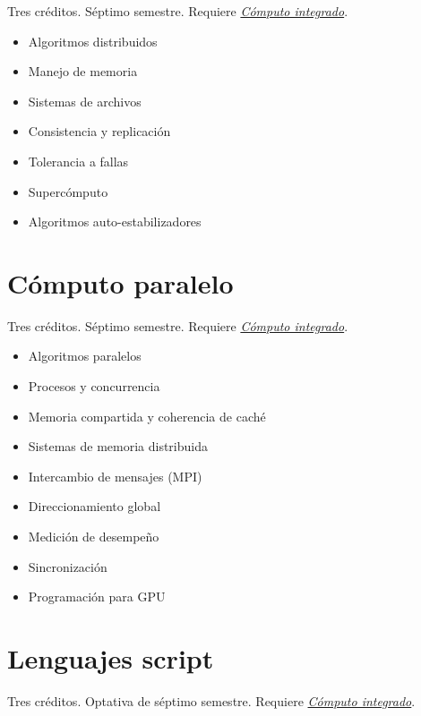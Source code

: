 \documentclass{article}
\begin{document}
\begin{multicols}{4}
Tres cr\'{e}ditos. S\'{e}ptimo semestre. Requiere \hyperlink{ci}{\em
  C\'{o}mputo integrado}.

\begin{itemize}
\item{Algoritmos distribuidos}
\item{Manejo de memoria}
\item{Sistemas de archivos}
\item{Consistencia y replicaci\'{o}n}
\item{Tolerancia a fallas}
\item{Superc\'{o}mputo}
\item{Algoritmos auto-estabilizadores}
\end{itemize}

\vfill\null \columnbreak

\hypertarget{cp}{\section*{C\'{o}mputo paralelo}} 

Tres cr\'{e}ditos. S\'{e}ptimo semestre. Requiere \hyperlink{ci}{\em
  C\'{o}mputo integrado}.

\begin{itemize}
\item{Algoritmos paralelos}
\item{Procesos y concurrencia}
\item{Memoria compartida y coherencia de cach\'{e}}
\item{Sistemas de memoria distribuida}
\item{Intercambio de mensajes (MPI)}
\item{Direccionamiento global}
\item{Medici\'{o}n de desempe\~{n}o}
\item{Sincronizaci\'{o}n}
\item{Programaci\'{o}n para GPU}
\end{itemize}

\vfill\null \columnbreak

\hypertarget{ls}{\section*{Lenguajes script}}

Tres cr\'{e}ditos. Optativa de s\'{e}ptimo semestre.
 Requiere \hyperlink{ci}{\em
  C\'{o}mputo integrado}.


\end{multicols}
\end{document}
